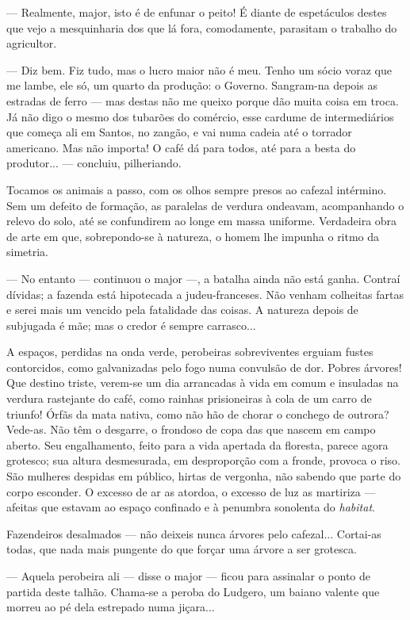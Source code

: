 --- Realmente, major, isto é de enfunar o peito! É diante de espetáculos
destes que vejo a mesquinharia dos que lá fora, comodamente, parasitam o
trabalho do agricultor.

--- Diz bem. Fiz tudo, mas o lucro maior não é meu. Tenho um sócio voraz
que me lambe, ele só, um quarto da produção: o Governo. Sangram-na
depois as estradas de ferro --- mas destas não me queixo porque dão
muita coisa em troca. Já não digo o mesmo dos tubarões do comércio, esse
cardume de intermediários que começa ali em Santos, no zangão, e vai
numa cadeia até o torrador americano. Mas não importa! O café dá para
todos, até para a besta do produtor... --- concluiu, pilheriando.

Tocamos os animais a passo, com os olhos sempre presos ao cafezal
intérmino. Sem um defeito de formação, as paralelas de verdura ondeavam,
acompanhando o relevo do solo, até se confundirem ao longe em massa
uniforme. Verdadeira obra de arte em que, sobrepondo-se à natureza, o
homem lhe impunha o ritmo da simetria.

--- No entanto --- continuou o major ---, a batalha ainda não está
ganha. Contraí dívidas; a fazenda está hipotecada a judeu-franceses. Não
venham colheitas fartas e serei mais um vencido pela fatalidade das
coisas. A natureza depois de subjugada é mãe; mas o credor é sempre
carrasco...

A espaços, perdidas na onda verde, perobeiras sobreviventes erguiam
fustes contorcidos, como galvanizadas pelo fogo numa convulsão de dor.
Pobres árvores! Que destino triste, verem-se um dia arrancadas à vida em
comum e insuladas na verdura rastejante do café, como rainhas
prisioneiras à cola de um carro de triunfo! Órfãs da mata nativa, como
não hão de chorar o conchego de outrora? Vede-as. Não têm o desgarre, o
frondoso de copa das que nascem em campo aberto. Seu engalhamento, feito
para a vida apertada da floresta, parece agora grotesco; sua altura
desmesurada, em desproporção com a fronde, provoca o riso. São mulheres
despidas em público, hirtas de vergonha, não sabendo que parte do corpo
esconder. O excesso de ar as atordoa, o excesso de luz as martiriza ---
afeitas que estavam ao espaço confinado e à penumbra sonolenta do
\emph{habitat}.

Fazendeiros desalmados --- não deixeis nunca árvores pelo cafezal...
Cortai-as todas, que nada mais pungente do que forçar uma árvore a ser
grotesca.

--- Aquela perobeira ali --- disse o major --- ficou para assinalar o
ponto de partida deste talhão. Chama-se a peroba do Ludgero, um baiano
valente que morreu ao pé dela estrepado numa jiçara...

